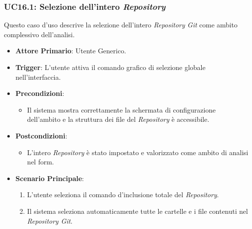 \documentclass[12pt, a4paper]{article}
\begin{document}
\newpage
\subsubsection{UC16.1: Selezione dell'intero \textit{Repository}}\label{uc:16.1}
Questo caso d'uso descrive la selezione dell'intero \textit{Repository Git} come ambito complessivo dell'analisi.
    \begin{itemize}
    \item \textbf{Attore Primario}: Utente Generico.
    \item \textbf{Trigger}: L'utente attiva il comando grafico di selezione globale nell'interfaccia.
    \item \textbf{Precondizioni}:\begin{itemize}\item Il sistema mostra correttamente la schermata di configurazione dell'ambito e la struttura dei file del \textit{Repository} è accessibile.\end{itemize}
    \item \textbf{Postcondizioni}:\begin{itemize}\item L'intero \textit{Repository} è stato impostato e valorizzato come ambito di analisi nel form.\end{itemize}
    \item \textbf{Scenario Principale}:
    \begin{enumerate}
        \item L'utente seleziona il comando d'inclusione totale del \textit{Repository}.
        \item Il sistema seleziona automaticamente tutte le cartelle e i file contenuti nel \textit{Repository Git}.
    \end{enumerate}
    \end{itemize}
\end{document}
